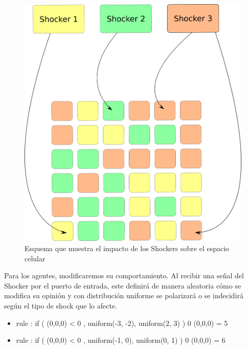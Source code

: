 \begin{figure}[!h]
\centering
\includegraphics[scale=0.5]{imagenes/agentes_celdas_modelo.png}
\caption{Esquema que muestra el impacto de los Shockers sobre el espacio celular}
\label{fig:modelo_shockers}
\end{figure}

Para los agentes, modificaremos su comportamiento. Al recibir una señal del Shocker por el puerto de entrada, este definirá de manera aleatoria cómo se modifica su opinión y con distribución uniforme se polarizará o se indecidirá según el tipo de shock que lo afecte.

\begin{itemize}
    \item[] rule : { if ( (0,0,0) < 0 , uniform(-3, -2), uniform(2, 3) ) } 0 { (0,0,0) = 5 }
    \item[] rule : { if ( (0,0,0) < 0 , uniform(-1, 0), uniform(0, 1) ) } 0 { (0,0,0) = 6 }
\end{itemize}



